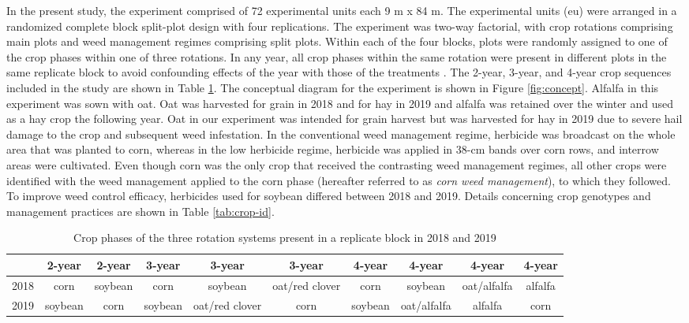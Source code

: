 \documentclass[
]{article}
\begin{document}
In the present study, the experiment comprised of 72 experimental units each 9 m x 84 m. The experimental units (eu) were arranged in a randomized complete block split-plot design with four replications. The experiment was two-way factorial, with crop rotations comprising main plots and weed management regimes comprising split plots. Within each of the four blocks, plots were randomly assigned to one of the crop phases within one of three rotations. In any year, all crop phases within the same rotation were present in different plots in the same replicate block to avoid confounding effects of the year with those of the treatments \citep{payneDesignAnalysisLong2015}. The 2-year, 3-year, and 4-year crop sequences included in the study are shown in Table \ref{tab:sequence}. The conceptual diagram for the experiment is shown in Figure \ref{fig:concept}. Alfalfa in this experiment was sown with oat. Oat was harvested for grain in 2018 and for hay in 2019 and alfalfa was retained over the winter and used as a hay crop the following year. Oat in our experiment was intended for grain harvest but was harvested for hay in 2019 due to severe hail damage to the crop and subsequent weed infestation. In the conventional weed management regime, herbicide was broadcast on the whole area that was planted to corn, whereas in the low herbicide regime, herbicide was applied in 38-cm bands over corn rows, and interrow areas were cultivated. Even though corn was the only crop that received the contrasting weed management regimes, all other crops were identified with the weed management applied to the corn phase (hereafter referred to as \emph{corn weed management}), to which they followed. To improve weed control efficacy, herbicides used for soybean differed between 2018 and 2019. Details concerning crop genotypes and management practices are shown in Table \ref{tab:crop-id}.

\begin{table}[H]

\caption{\label{tab:sequence}Crop phases of the three rotation systems present in a replicate block in 2018 and 2019}
\centering
\begin{tabular}[t]{l|c|c|c|c|c|c|c|c|c}
\hline
 & 2-year & 2-year & 3-year & 3-year & 3-year & 4-year & 4-year & 4-year & 4-year\\
\hline
2018 & corn & soybean & corn & soybean & oat/red clover & corn & soybean & oat/alfalfa & alfalfa\\
2019 & soybean & corn & soybean & oat/red clover & corn & soybean & oat/alfalfa & alfalfa & corn\\
\hline
\end{tabular}
\end{table}
\end{document}
